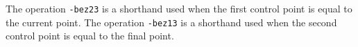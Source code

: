 \documentclass{book}
\begin{document}
\bigskip
\ifdefined\HCode
{}
\else
{}
\fi
\bigskip

\noindent The operation \texttt{-bez23} is a shorthand used when the first control point is equal to the current point. The operation \texttt{-bez13} is a shorthand used when the second control point is equal to the final point.
\end{document}
